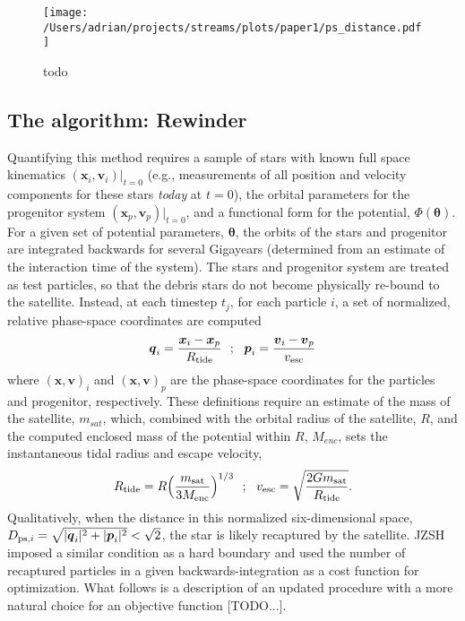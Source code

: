 \documentclass[preprint]{aastex}
\newcommand{\bs}{\boldsymbol}
\begin{document}
\begin{figure}[h]
\begin{center}
\texttt{[image: /Users/adrian/projects/streams/plots/paper1/ps\_distance.pdf]}
\caption{ todo }\label{fig:ps_distance}
\end{center}
\end{figure}

\subsection{The algorithm: Rewinder}
Quantifying this method requires a sample of stars with known full
space kinematics $(\bs{x}_{i}, \bs{v}_{i})|_{t=0}$ (e.g., measurements of all position and velocity components for these stars \emph{today} at $t=0$), the orbital parameters
for the progenitor system $(\bs{x}_p, \bs{v}_p)|_{t=0}$, and a
functional form for the potential, $\Phi({\boldsymbol\theta})$. For a
given set of potential parameters, $\boldsymbol\theta$, the orbits of the stars and
progenitor are integrated backwards for several Gigayears (determined from an
estimate of the interaction time of the system). The stars and
progenitor system are treated as test particles, so that the debris
stars do not become physically re-bound to the satellite. Instead, at each
timestep $t_j$, for each particle $i$, a set of normalized, relative
phase-space coordinates are
computed 
\begin{equation}
  \bs{q}_{i} = \frac{\bs{x}_{i} -
    \bs{x}_{p}}{R_{\rm tide}}\,\,\,\,;\,\,\,\,\bs{p}_{i} = \frac{\bs{v}_{i} -
    \bs{v}_{p}}{v_{\rm esc}}
\end{equation}
where $(\bs{x},\bs{v})_{i}$ and $(\bs{x},\bs{v})_{p}$ are the phase-space coordinates for the particles and progenitor, respectively. These definitions require an estimate of the mass of the
satellite, $m_{sat}$, which, combined with the orbital radius of the satellite, $R$, and the computed enclosed mass
of the potential within $R$, $M_{enc}$, sets the instantaneous tidal radius and
escape velocity,
\begin{equation}
  R_{\rm tide}=R\Big(\frac{m_{\rm sat}}{3M_{\rm enc}}\Big)^{1/3}\,\,\,\,;\,\,\,\,
  v_{\rm esc}=\sqrt{\frac{2Gm_{\rm sat}}{R_{\rm tide}}}.
\end{equation}
Qualitatively, when the distance in this normalized six-dimensional space,
$D_{{\rm ps},i}=\sqrt{|\bs{q}_{i}|^2+|\bs{p}_{i}|^2} < \sqrt{2}$, the star is
likely recaptured by the satellite. JZSH imposed a similar condition as a hard boundary and used the number of recaptured particles in a given backwards-integration as a cost function for optimization. What follows is a description of an updated procedure with a more natural choice for an objective function [TODO...].
\end{document}
